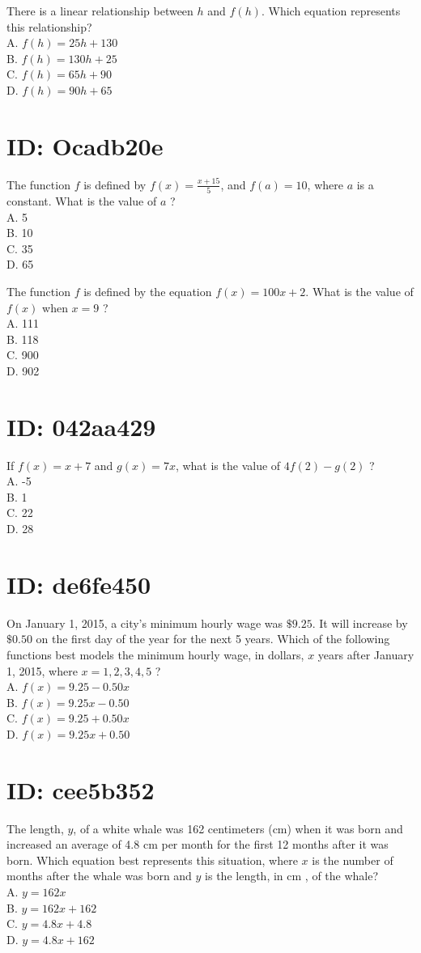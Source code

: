 There is a linear relationship between $h$ and $f(h)$. Which equation represents this relationship?\\
A. $f(h)=25 h+130$\\
B. $f(h)=130 h+25$\\
C. $f(h)=65 h+90$\\
D. $f(h)=90 h+65$

\section*{ID: Ocadb20e}
The function $f$ is defined by $f(x)=\frac{x+15}{5}$, and $f(a)=10$, where $a$ is a constant. What is the value of $a$ ?\\
A. 5\\
B. 10\\
C. 35\\
D. 65

The function $f$ is defined by the equation $f(x)=100 x+2$. What is the value of $f(x)$ when $x=9$ ?\\
A. 111\\
B. 118\\
C. 900\\
D. 902

\section*{ID: 042aa429}
If $f(x)=x+7$ and $g(x)=7 x$, what is the value of $4 f(2)-g(2)$ ?\\
A. -5\\
B. 1\\
C. 22\\
D. 28

\section*{ID: de6fe450}
On January 1, 2015, a city's minimum hourly wage was $\$ 9.25$. It will increase by $\$ 0.50$ on the first day of the year for the next 5 years. Which of the following functions best models the minimum hourly wage, in dollars, $x$ years after January 1, 2015, where $x=1,2,3,4,5$ ?\\
A. $f(x)=9.25-0.50 x$\\
B. $f(x)=9.25 x-0.50$\\
C. $f(x)=9.25+0.50 x$\\
D. $f(x)=9.25 x+0.50$

\section*{ID: cee5b352}
The length, $y$, of a white whale was 162 centimeters (cm) when it was born and increased an average of 4.8 cm per month for the first 12 months after it was born. Which equation best represents this situation, where $x$ is the number of months after the whale was born and $y$ is the length, in cm , of the whale?\\
A. $y=162 x$\\
B. $y=162 x+162$\\
C. $y=4.8 x+4.8$\\
D. $y=4.8 x+162$

